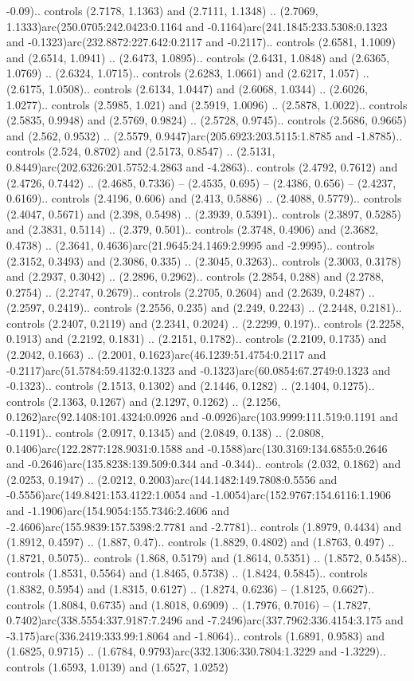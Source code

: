 -0.09).. controls (2.7178, 1.1363) and (2.7111, 1.1348) .. (2.7069, 1.1333)arc(250.0705:242.0423:0.1164 and -0.1164)arc(241.1845:233.5308:0.1323 and -0.1323)arc(232.8872:227.642:0.2117 and -0.2117).. controls (2.6581, 1.1009) and (2.6514, 1.0941) .. (2.6473, 1.0895).. controls (2.6431, 1.0848) and (2.6365, 1.0769) .. (2.6324, 1.0715).. controls (2.6283, 1.0661) and (2.6217, 1.057) .. (2.6175, 1.0508).. controls (2.6134, 1.0447) and (2.6068, 1.0344) .. (2.6026, 1.0277).. controls (2.5985, 1.021) and (2.5919, 1.0096) .. (2.5878, 1.0022).. controls (2.5835, 0.9948) and (2.5769, 0.9824) .. (2.5728, 0.9745).. controls (2.5686, 0.9665) and (2.562, 0.9532) .. (2.5579, 0.9447)arc(205.6923:203.5115:1.8785 and -1.8785).. controls (2.524, 0.8702) and (2.5173, 0.8547) .. (2.5131, 0.8449)arc(202.6326:201.5752:4.2863 and -4.2863).. controls (2.4792, 0.7612) and (2.4726, 0.7442) .. (2.4685, 0.7336) -- (2.4535, 0.695) -- (2.4386, 0.656) -- (2.4237, 0.6169).. controls (2.4196, 0.606) and (2.413, 0.5886) .. (2.4088, 0.5779).. controls (2.4047, 0.5671) and (2.398, 0.5498) .. (2.3939, 0.5391).. controls (2.3897, 0.5285) and (2.3831, 0.5114) .. (2.379, 0.501).. controls (2.3748, 0.4906) and (2.3682, 0.4738) .. (2.3641, 0.4636)arc(21.9645:24.1469:2.9995 and -2.9995).. controls (2.3152, 0.3493) and (2.3086, 0.335) .. (2.3045, 0.3263).. controls (2.3003, 0.3178) and (2.2937, 0.3042) .. (2.2896, 0.2962).. controls (2.2854, 0.288) and (2.2788, 0.2754) .. (2.2747, 0.2679).. controls (2.2705, 0.2604) and (2.2639, 0.2487) .. (2.2597, 0.2419).. controls (2.2556, 0.235) and (2.249, 0.2243) .. (2.2448, 0.2181).. controls (2.2407, 0.2119) and (2.2341, 0.2024) .. (2.2299, 0.197).. controls (2.2258, 0.1913) and (2.2192, 0.1831) .. (2.2151, 0.1782).. controls (2.2109, 0.1735) and (2.2042, 0.1663) .. (2.2001, 0.1623)arc(46.1239:51.4754:0.2117 and -0.2117)arc(51.5784:59.4132:0.1323 and -0.1323)arc(60.0854:67.2749:0.1323 and -0.1323).. controls (2.1513, 0.1302) and (2.1446, 0.1282) .. (2.1404, 0.1275).. controls (2.1363, 0.1267) and (2.1297, 0.1262) .. (2.1256, 0.1262)arc(92.1408:101.4324:0.0926 and -0.0926)arc(103.9999:111.519:0.1191 and -0.1191).. controls (2.0917, 0.1345) and (2.0849, 0.138) .. (2.0808, 0.1406)arc(122.2877:128.9031:0.1588 and -0.1588)arc(130.3169:134.6855:0.2646 and -0.2646)arc(135.8238:139.509:0.344 and -0.344).. controls (2.032, 0.1862) and (2.0253, 0.1947) .. (2.0212, 0.2003)arc(144.1482:149.7808:0.5556 and -0.5556)arc(149.8421:153.4122:1.0054 and -1.0054)arc(152.9767:154.6116:1.1906 and -1.1906)arc(154.9054:155.7346:2.4606 and -2.4606)arc(155.9839:157.5398:2.7781 and -2.7781).. controls (1.8979, 0.4434) and (1.8912, 0.4597) .. (1.887, 0.47).. controls (1.8829, 0.4802) and (1.8763, 0.497) .. (1.8721, 0.5075).. controls (1.868, 0.5179) and (1.8614, 0.5351) .. (1.8572, 0.5458).. controls (1.8531, 0.5564) and (1.8465, 0.5738) .. (1.8424, 0.5845).. controls (1.8382, 0.5954) and (1.8315, 0.6127) .. (1.8274, 0.6236) -- (1.8125, 0.6627).. controls (1.8084, 0.6735) and (1.8018, 0.6909) .. (1.7976, 0.7016) -- (1.7827, 0.7402)arc(338.5554:337.9187:7.2496 and -7.2496)arc(337.7962:336.4154:3.175 and -3.175)arc(336.2419:333.99:1.8064 and -1.8064).. controls (1.6891, 0.9583) and (1.6825, 0.9715) .. (1.6784, 0.9793)arc(332.1306:330.7804:1.3229 and -1.3229).. controls (1.6593, 1.0139) and (1.6527, 1.0252) 